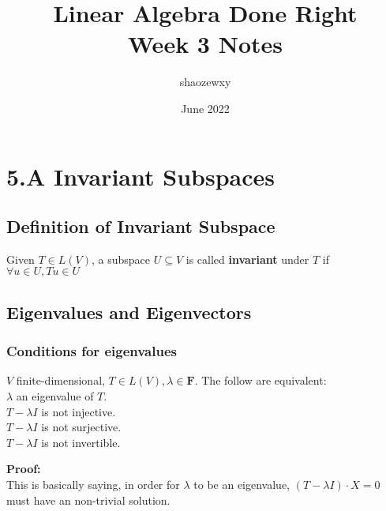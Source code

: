 \documentclass{article}
\title{Linear Algebra Done Right\\
\large{Week 3 Notes}}
\author{shaozewxy }
\date{June 2022}
\begin{document}
\maketitle

\setcounter{secnumdepth}{0}
\section{5.A Invariant Subspaces}
\subsection{Definition of Invariant Subspace}
\begin{addmargin}[1em]{0em}
Given $T \in L(V)$, a subspace $U \subseteq V$ is called \textbf{invariant} under $T$ if $\forall u \in U, Tu \in U$
\end{addmargin}
\subsection{Eigenvalues and Eigenvectors}
\subsubsection{Conditions for eigenvalues}
\begin{addmargin}[1em]{0em}
$V$ finite-dimensional, $T \in L(V), \lambda \in \textbf{F}$. The follow are equivalent:\\
$\lambda$ an eigenvalue of $T$.\\
$T - \lambda I$ is not injective.\\
$T - \lambda I$ is not surjective.\\
$T - \lambda I$ is not invertible.
\end{addmargin}
\textbf{Proof:}\\
This is basically saying, in order for $\lambda$ to be an eigenvalue, $(T - \lambda I) \cdot X = 0$ must have an non-trivial solution.
\end{document}
